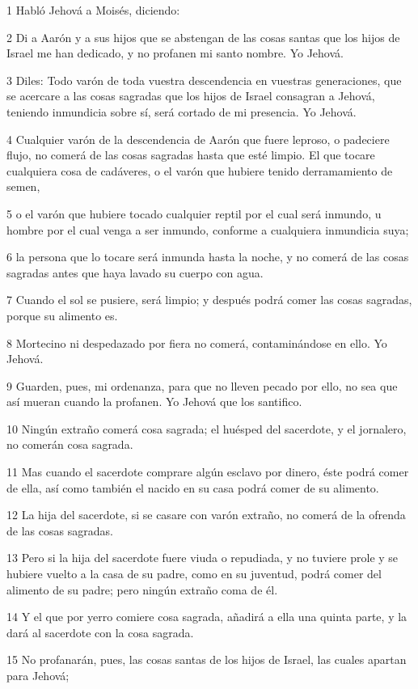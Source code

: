 \par 1 Habló Jehová a Moisés, diciendo:
\par 2 Di a Aarón y a sus hijos que se abstengan de las cosas santas que los hijos de Israel me han dedicado, y no profanen mi santo nombre. Yo Jehová.
\par 3 Diles: Todo varón de toda vuestra descendencia en vuestras generaciones, que se acercare a las cosas sagradas que los hijos de Israel consagran a Jehová, teniendo inmundicia sobre sí, será cortado de mi presencia. Yo Jehová.
\par 4 Cualquier varón de la descendencia de Aarón que fuere leproso, o padeciere flujo, no comerá de las cosas sagradas hasta que esté limpio. El que tocare cualquiera cosa de cadáveres, o el varón que hubiere tenido derramamiento de semen,
\par 5 o el varón que hubiere tocado cualquier reptil por el cual será inmundo, u hombre por el cual venga a ser inmundo, conforme a cualquiera inmundicia suya;
\par 6 la persona que lo tocare será inmunda hasta la noche, y no comerá de las cosas sagradas antes que haya lavado su cuerpo con agua.
\par 7 Cuando el sol se pusiere, será limpio; y después podrá comer las cosas sagradas, porque su alimento es.
\par 8 Mortecino ni despedazado por fiera no comerá, contaminándose en ello. Yo Jehová.
\par 9 Guarden, pues, mi ordenanza, para que no lleven pecado por ello, no sea que así mueran cuando la profanen. Yo Jehová que los santifico.
\par 10 Ningún extraño comerá cosa sagrada; el huésped del sacerdote, y el jornalero, no comerán cosa sagrada.
\par 11 Mas cuando el sacerdote comprare algún esclavo por dinero, éste podrá comer de ella, así como también el nacido en su casa podrá comer de su alimento.
\par 12 La hija del sacerdote, si se casare con varón extraño, no comerá de la ofrenda de las cosas sagradas.
\par 13 Pero si la hija del sacerdote fuere viuda o repudiada, y no tuviere prole y se hubiere vuelto a la casa de su padre, como en su juventud, podrá comer del alimento de su padre; pero ningún extraño coma de él.
\par 14 Y el que por yerro comiere cosa sagrada, añadirá a ella una quinta parte, y la dará al sacerdote con la cosa sagrada.
\par 15 No profanarán, pues, las cosas santas de los hijos de Israel, las cuales apartan para Jehová;
